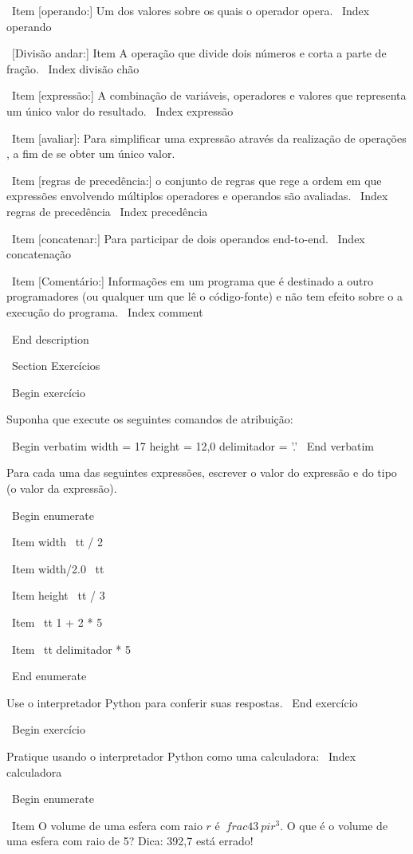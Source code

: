 \documentclass[10pt]{book}
\begin{document}
\begin {itemize}
{\ Item [operando:] Um dos valores sobre os quais o operador opera.
\ Index {operando}

\ [Divisão andar:] Item A operação que divide dois números e corta
a parte de fração.
\ Index {divisão chão}

\ Item [expressão:] A combinação de variáveis, operadores e valores que
representa um único valor do resultado.
\ Index {expressão}

\ Item [avaliar]: Para simplificar uma expressão através da realização de operações
, a fim de se obter um único valor.

\ Item [regras de precedência:] o conjunto de regras que rege a ordem em que
expressões envolvendo múltiplos operadores e operandos são avaliadas.
\ Index {regras de precedência}
\ Index {} precedência

\ Item [concatenar:] Para participar de dois operandos end-to-end.
\ Index {concatenação}

\ Item [Comentário:] Informações em um programa que é destinado a outro
programadores (ou qualquer um que lê o código-fonte) e não tem efeito sobre o
a execução do programa.
\ Index {comment}

\ End {description}


\ Section {Exercícios}

\ Begin {} exercício

Suponha que execute os seguintes comandos de atribuição:

\ Begin {verbatim}
width = 17
height = 12,0
delimitador = '.'
\ End {verbatim}

Para cada uma das seguintes expressões, escrever o valor do
expressão e do tipo (o valor da expressão).

\ Begin {enumerate}

\ Item {width \ tt / 2}

\ Item {width/2.0 \ tt}

\ Item {height \ tt / 3}

\ Item {\ tt 1 + 2 * 5}

\ Item {\ tt delimitador * 5}

\ End {enumerate}

Use o interpretador Python para conferir suas respostas.
\ End {} exercício

\ Begin {} exercício

Pratique usando o interpretador Python como uma calculadora: 
\ Index {calculadora}

\ Begin {enumerate}

\ Item O volume de uma esfera com raio $ r $ é $ \ frac {4} {3} \ pi r ^ 3 $.
  O que é o volume de uma esfera com raio de 5? Dica: 392,7 está errado!

}
\end{itemize}
\end{document}
